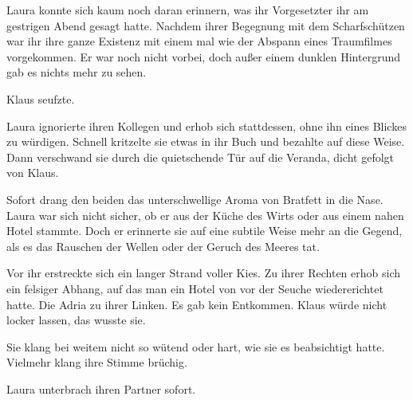 \par

Laura konnte sich kaum noch daran erinnern, was ihr Vorgesetzter ihr am gestrigen Abend gesagt hatte. Nachdem ihrer Begegnung mit dem Scharfschützen war ihr ihre ganze Existenz mit einem mal wie der Abspann eines Traumfilmes vorgekommen. Er war noch nicht vorbei, doch außer einem dunklen Hintergrund gab es nichts mehr zu sehen.

\par

Klaus seufzte. 

\par

Laura ignorierte ihren Kollegen und erhob sich stattdessen, ohne ihn eines Blickes zu würdigen. Schnell kritzelte sie etwas in ihr Buch und bezahlte auf diese Weise. Dann verschwand sie durch die quietschende Tür auf die Veranda, dicht gefolgt von Klaus.

\par

Sofort drang den beiden das unterschwellige Aroma von Bratfett in die Nase. Laura war sich nicht sicher, ob er aus der Küche des Wirts oder aus einem nahen Hotel stammte. Doch er erinnerte sie auf eine subtile Weise mehr an die Gegend, als es das Rauschen der Wellen oder der Geruch des Meeres tat.

\par

Vor ihr erstreckte sich ein langer Strand voller Kies. Zu ihrer Rechten erhob sich ein felsiger Abhang, auf das man ein Hotel von vor der Seuche wiedererichtet hatte. Die Adria zu ihrer Linken. Es gab kein Entkommen. Klaus würde nicht locker lassen, das wusste sie.

\par

 Sie klang bei weitem nicht so wütend oder hart, wie sie es beabsichtigt hatte. Vielmehr klang ihre Stimme brüchig. 

\par


\par

Laura unterbrach ihren Partner sofort. 

